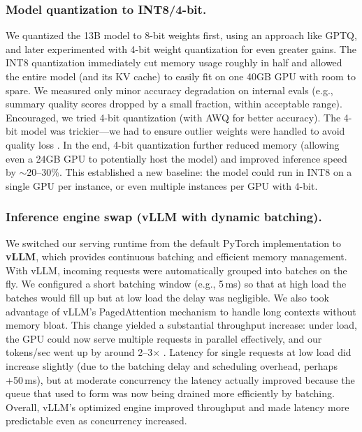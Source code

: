 \subsubsection{Model quantization to INT8/4-bit.}
We quantized the 13B model to 8-bit weights first, using an approach like GPTQ, and later experimented with 4-bit weight quantization for even greater gains. The INT8 quantization immediately cut memory usage roughly in half and allowed the entire model (and its KV cache) to easily fit on one 40GB GPU with room to spare. We measured only minor accuracy degradation on internal evals (e.g., summary quality scores dropped by a small fraction, within acceptable range). Encouraged, we tried 4-bit quantization (with AWQ for better accuracy). The 4-bit model was trickier---we had to ensure outlier weights were handled to avoid quality loss \cite{Lin2023AWQ}. In the end, 4-bit quantization further reduced memory (allowing even a 24GB GPU to potentially host the model) and improved inference speed by $\sim$20--30\%. This established a new baseline: the model could run in INT8 on a single GPU per instance, or even multiple instances per GPU with 4-bit.

\subsubsection{Inference engine swap (vLLM with dynamic batching).}
We switched our serving runtime from the default PyTorch implementation to \textbf{vLLM}, which provides continuous batching and efficient memory management. With vLLM, incoming requests were automatically grouped into batches on the fly. We configured a short batching window (e.g., 5\,ms) so that at high load the batches would fill up but at low load the delay was negligible. We also took advantage of vLLM’s PagedAttention mechanism to handle long contexts without memory bloat. This change yielded a substantial throughput increase: under load, the GPU could now serve multiple requests in parallel effectively, and our tokens/sec went up by around 2--3$\times$ \cite{Kwon2023vLLM}. Latency for single requests at low load did increase slightly (due to the batching delay and scheduling overhead, perhaps +50\,ms), but at moderate concurrency the latency actually improved because the queue that used to form was now being drained more efficiently by batching. Overall, vLLM’s optimized engine improved throughput and made latency more predictable even as concurrency increased.

